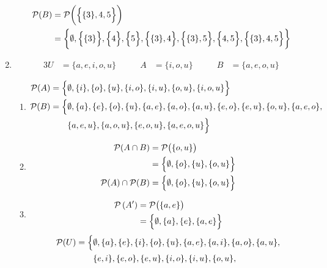 \documentclass[../notes.tex]{subfiles}
\begin{document}
\begin{enumerate}
\begin{align*}
            \mathcal{P}(B) &= \mathcal{P}\biggl(\Bigl\{\{3\}, 4, 5\Bigr\}\biggr)\\
            &= \biggl\{\emptyset, \Bigl\{\{3\}\Bigr\}, \Bigl\{4\Bigr\}, \Bigl\{5\Bigr\}, \Bigl\{\{3\}, 4\Bigr\}, \Bigl\{\{3\}, 5\Bigr\}, \Bigl\{4, 5\Bigr\}, \Bigl\{\{3\}, 4, 5\Bigr\}\biggr\}
          \end{align*}
          \pagebreak
        \item 
          \begin{alignat*}{3}
            U &= \{a, e, i, o, u\} \qquad & A &= \{i, o, u\} \qquad & B &= \{a, e, o, u\}
          \end{alignat*}
          \begin{enumerate}[label=(\alph*)]
            \item
              \begin{align*}
                \mathcal{P}(A) &= \Bigl\{\emptyset, \{i\}, \{o\}, \{u\}, \{i, o\}, \{i, u\}, \{o, u\}, \{i, o, u\}\Bigr\}\\
                \mathcal{P}(B) &= \Bigl\{\emptyset, \{a\}, \{e\}, \{o\}, \{u\}, \{a, e\}, \{a, o\}, \{a, u\}, \{e, o\}, \{e, u\}, \{o, u\}, \{a, e, o\},\\
                & \qquad \{a, e, u\}, \{a, o, u\}, \{e, o, u\}, \{a, e, o, u\}\Bigr\}
              \end{align*}
            \item
              \begin{align*}
                \mathcal{P}(A \cap B) &= \mathcal{P}\bigl(\{o, u\}\bigr)\\
                &= \Bigl\{\emptyset, \{o\}, \{u\}, \{o, u\}\Bigr\}\\
                \mathcal{P}(A) \cap \mathcal{P}(B) &= \Bigl\{\emptyset, \{o\}, \{u\}, \{o, u\}\Bigr\}
              \end{align*}
            \item
              \begin{align*}
                \mathcal{P}\left(A'\right) &= \mathcal{P}\bigl(\{a, e\}\bigr)\\
                &= \Bigl\{\emptyset, \{a\}, \{e\}, \{a, e\}\Bigr\}
              \end{align*}
              \begin{align*}
                \mathcal{P}(U) &= \Bigl\{\emptyset, \{a\}, \{e\}, \{i\}, \{o\}, \{u\}, \{a, e\}, \{a, i\}, \{a, o\}, \{a, u\},\\
                & \qquad \{e, i\}, \{e, o\}, \{e, u\}, \{i, o\}, \{i, u\}, \{o, u\},\\

\end{align*}
\end{enumerate}
\end{enumerate}
\end{document}

